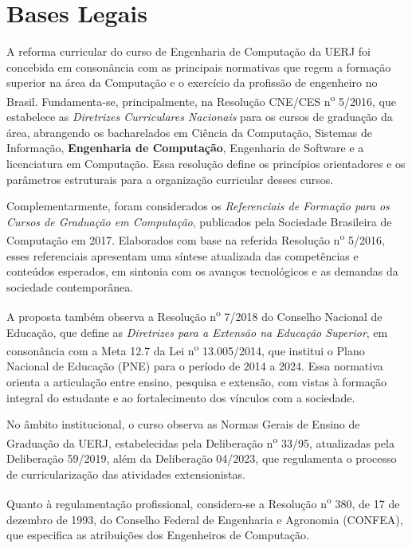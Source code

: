 \chapter{Bases Legais}
\thispagestyle{plain}

A reforma curricular do curso de Engenharia de Computação da UERJ foi concebida em consonância com as principais normativas que regem a formação superior na área da Computação e o exercício da profissão de engenheiro no Brasil. Fundamenta-se, principalmente, na Resolução CNE/CES n\textsuperscript{o} 5/2016, que estabelece as \textit{Diretrizes Curriculares Nacionais} para os cursos de graduação da área, abrangendo os bacharelados em Ciência da Computação, Sistemas de Informação, \textbf{Engenharia de Computação}, Engenharia de Software e a licenciatura em Computação. Essa resolução define os princípios orientadores e os parâmetros estruturais para a organização curricular desses cursos.

Complementarmente, foram considerados os \textit{Referenciais de Formação para os Cursos de Graduação em Computação}, publicados pela Sociedade Brasileira de Computação em 2017. Elaborados com base na referida Resolução n\textsuperscript{o}  5/2016, esses referenciais apresentam uma síntese atualizada das competências e conteúdos esperados, em sintonia com os avanços tecnológicos e as demandas da sociedade contemporânea.

A proposta também observa a Resolução n\textsuperscript{o} 7/2018 do Conselho Nacional de Educação, que define as \textit{Diretrizes para a Extensão na Educação Superior}, em consonância com a Meta 12.7 da Lei n\textsuperscript{o} 13.005/2014, que institui o Plano Nacional de Educação (PNE) para o período de 2014 a 2024. Essa normativa orienta a articulação entre ensino, pesquisa e extensão, com vistas à formação integral do estudante e ao fortalecimento dos vínculos com a sociedade.

No âmbito institucional, o curso observa as Normas Gerais de Ensino de Graduação da UERJ, estabelecidas pela Deliberação n\textsuperscript{o} 33/95, atualizadas pela Deliberação  59/2019, além da Deliberação  04/2023, que regulamenta o processo de curricularização das atividades extensionistas.

Quanto à regulamentação profissional, considera-se a Resolução n\textsuperscript{o} 380, de 17 de dezembro de 1993, do Conselho Federal de Engenharia e Agronomia (CONFEA), que especifica as atribuições dos Engenheiros de Computação.

